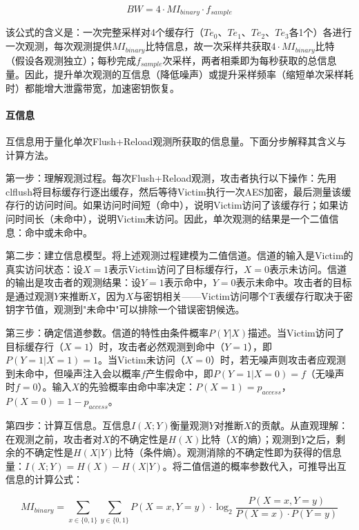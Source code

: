 \begin{equation}
BW = 4 \cdot MI_{binary} \cdot f_{sample}
\end{equation}

该公式的含义是：一次完整采样对4个缓存行（$Te_0$、$Te_1$、$Te_2$、$Te_3$各1个）各进行一次观测，每次观测提供$MI_{binary}$比特信息，故一次采样共获取$4 \cdot MI_{binary}$比特（假设各观测独立）；每秒完成$f_{sample}$次采样，两者相乘即为每秒获取的总信息量。因此，提升单次观测的互信息（降低噪声）或提升采样频率（缩短单次采样耗时）都能增大泄露带宽，加速密钥恢复。

\paragraph{互信息}

互信息用于量化单次Flush+Reload观测所获取的信息量。下面分步解释其含义与计算方法。

第一步：理解观测过程。每次Flush+Reload观测，攻击者执行以下操作：先用clflush将目标缓存行逐出缓存，然后等待Victim执行一次AES加密，最后测量该缓存行的访问时间。如果访问时间短（命中），说明Victim访问了该缓存行；如果访问时间长（未命中），说明Victim未访问。因此，单次观测的结果是一个二值信息：命中或未命中。

第二步：建立信息模型。将上述观测过程建模为二值信道。信道的输入是Victim的真实访问状态：设$X=1$表示Victim访问了目标缓存行，$X=0$表示未访问。信道的输出是攻击者的观测结果：设$Y=1$表示命中，$Y=0$表示未命中。攻击者的目标是通过观测$Y$来推断$X$，因为$X$与密钥相关——Victim访问哪个T表缓存行取决于密钥字节值，观测到"未命中"可以排除一个错误密钥候选。

第三步：确定信道参数。信道的特性由条件概率$P(Y|X)$描述。当Victim访问了目标缓存行（$X=1$）时，攻击者必然观测到命中（$Y=1$），即$P(Y=1|X=1)=1$。当Victim未访问（$X=0$）时，若无噪声则攻击者应观测到未命中，但噪声注入会以概率$f$产生假命中，即$P(Y=1|X=0)=f$（无噪声时$f=0$）。输入$X$的先验概率由命中率决定：$P(X=1)=p_{access}$，$P(X=0)=1-p_{access}$。

第四步：计算互信息。互信息$I(X;Y)$衡量观测$Y$对推断$X$的贡献。从直观理解：在观测之前，攻击者对$X$的不确定性是$H(X)$比特（$X$的熵）；观测到$Y$之后，剩余的不确定性是$H(X|Y)$比特（条件熵）。观测消除的不确定性即为获得的信息量：$I(X;Y) = H(X) - H(X|Y)$。将二值信道的概率参数代入，可推导出互信息的计算公式：

\begin{equation}
MI_{binary} = \sum_{x \in \{0,1\}} \sum_{y \in \{0,1\}} P(X=x, Y=y) \cdot \log_2 \frac{P(X=x, Y=y)}{P(X=x) \cdot P(Y=y)}
\end{equation}

